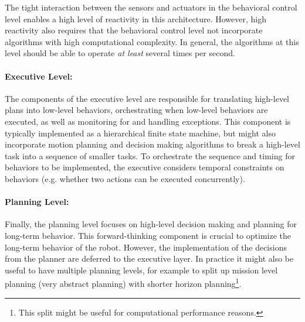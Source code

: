 The tight interaction between the sensors and actuators in the behavioral control level enables a high level of reactivity in this architecture. However, high reactivity also requires that the behavioral control level not incorporate algorithms with high computational complexity. In general, the algorithms at this level should be able to operate \textit{at least} several times per second.


\paragraph{Executive Level:}
The components of the executive level are responsible for translating high-level plans into low-level behaviors, orchestrating when low-level behaviors are executed, as well as monitoring for and handling exceptions. This component is typically implemented as a hierarchical finite state machine, but might also incorporate motion planning and decision making algorithms to break a high-level task into a sequence of smaller tasks. To orchestrate the sequence and timing for behaviors to be implemented, the executive considers temporal constraints on behaviors (e.g. whether two actions can be executed concurrently).

\paragraph{Planning Level:}
Finally, the planning level focuses on high-level decision making and planning for long-term behavior. This forward-thinking component is crucial to optimize the long-term behavior of the robot. However, the implementation of the decisions from the planner are deferred to the executive layer. In practice it might also be useful to have multiple planning levels, for example to split up mission level planning (very abstract planning) with shorter horizon planning\footnote{This split might be useful for computational performance reasons.}.

